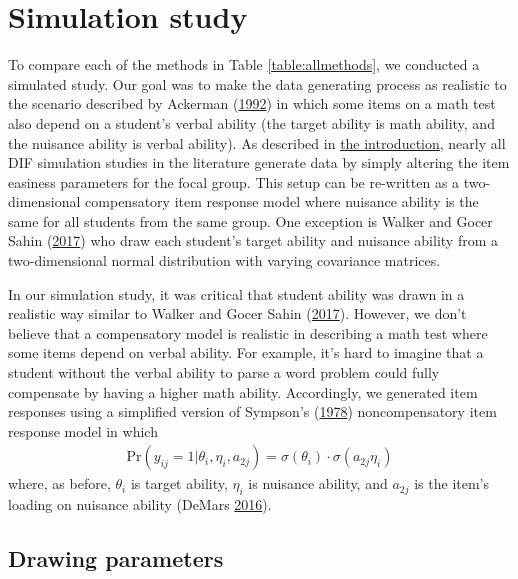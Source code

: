 \documentclass[
  11pt,
]{article}
\begin{document}
\hypertarget{simstudy}{%
\section{Simulation study}\label{simstudy}}

To compare each of the methods in Table \ref{table:allmethods}, we conducted a simulated study. Our goal was to make the data generating process as realistic to the scenario described by Ackerman (\protect\hyperlink{ref-ackerman1992didactic}{1992}) in which some items on a math test also depend on a student's verbal ability (the target ability is math ability, and the nuisance ability is verbal ability). As described in \protect\hyperlink{intro}{the introduction}, nearly all DIF simulation studies in the literature generate data by simply altering the item easiness parameters for the focal group. This setup can be re-written as a two-dimensional compensatory item response model where nuisance ability is the same for all students from the same group. One exception is Walker and Gocer Sahin (\protect\hyperlink{ref-walker2017using}{2017}) who draw each student's target ability and nuisance ability from a two-dimensional normal distribution with varying covariance matrices.

In our simulation study, it was critical that student ability was drawn in a realistic way similar to Walker and Gocer Sahin (\protect\hyperlink{ref-walker2017using}{2017}). However, we don't believe that a compensatory model is realistic in describing a math test where some items depend on verbal ability. For example, it's hard to imagine that a student without the verbal ability to parse a word problem could fully compensate by having a higher math ability. Accordingly, we generated item responses using a simplified version of Sympson's (\protect\hyperlink{ref-sympson1978model}{1978}) noncompensatory item response model in which
\begin{align}
\text{Pr}(y_{ij} = 1 | \theta_i, \eta_i, a_{2j}) = \sigma(\theta_i) \cdot \sigma(a_{2j}\eta_i)
\end{align}
where, as before, \(\theta_i\) is target ability, \(\eta_i\) is nuisance ability, and \(a_{2j}\) is the item's loading on nuisance ability (DeMars \protect\hyperlink{ref-demars2016partially}{2016}).

\hypertarget{drawing-parameters}{%
\subsection{Drawing parameters}\label{drawing-parameters}}
\end{document}
